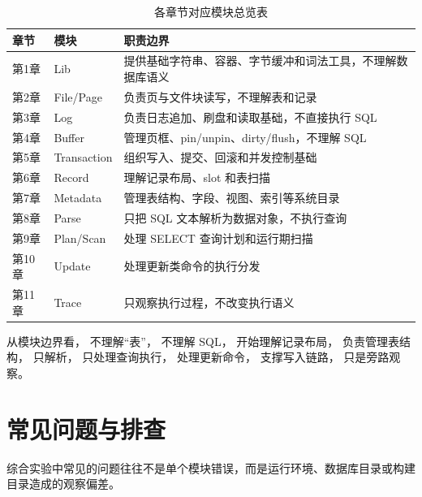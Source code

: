 \begin{table}[htbp]
  \centering
  \small
  \setlength{\tabcolsep}{4pt}
  \caption{各章节对应模块总览表}
  \label{tab:integration-chapter-module}
  \begin{tabularx}{\textwidth}{p{18mm}p{33mm}Y}
    \toprule
    章节 & 模块 & 职责边界 \\
    \midrule
    第1章 & Lib & 提供基础字符串、容器、字节缓冲和词法工具，不理解数据库语义 \\
    第2章 & File/Page & 负责页与文件块读写，不理解表和记录 \\
    第3章 & Log & 负责日志追加、刷盘和读取基础，不直接执行 SQL \\
    第4章 & Buffer & 管理页框、pin/unpin、dirty/flush，不理解 SQL \\
    第5章 & Transaction & 组织写入、提交、回滚和并发控制基础 \\
    第6章 & Record & 理解记录布局、slot 和表扫描 \\
    第7章 & Metadata & 管理表结构、字段、视图、索引等系统目录 \\
    第8章 & Parse & 只把 SQL 文本解析为数据对象，不执行查询 \\
    第9章 & Plan/Scan & 处理 SELECT 查询计划和运行期扫描 \\
    第10章 & Update & 处理更新类命令的执行分发 \\
    第11章 & Trace & 只观察执行过程，不改变执行语义 \\
    \bottomrule
  \end{tabularx}
\end{table}

从模块边界看， 不理解“表”， 不理解 SQL， 开始理解记录布局， 负责管理表结构， 只解析， 只处理查询执行， 处理更新命令， 支撑写入链路， 只是旁路观察。

\section{常见问题与排查}

综合实验中常见的问题往往不是单个模块错误，而是运行环境、数据库目录或构建目录造成的观察偏差。

